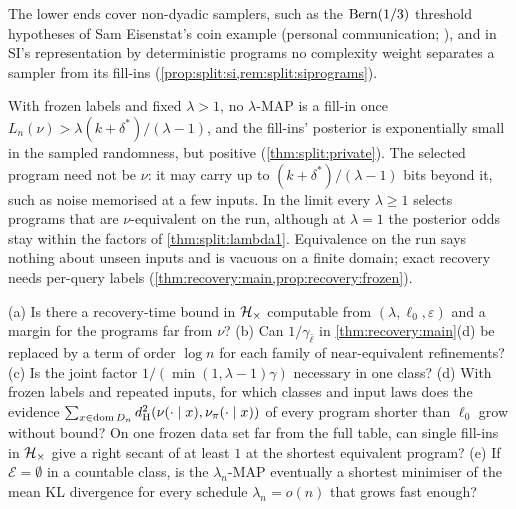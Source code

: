 The lower ends cover non-dyadic samplers, such as the $\operatorname{Bern}(1/3)$ threshold hypotheses of Sam Eisenstat's coin example (personal communication; \citealp[Section~7.3]{claudeSFI2026fundamentals}), %
and in SI's representation by deterministic programs no complexity weight separates a sampler from its fill-ins (\cref{prop:split:si,rem:split:siprograms}).

\begin{remark}\label{rem:split:reading}
With frozen labels and fixed $\lambda>1$, no $\lambda$-MAP is a fill-in once $L_n(\nu)>\lambda(k+\delta^*)/(\lambda-1)$, and the fill-ins' posterior is exponentially small in the sampled randomness, but positive (\cref{thm:split:private}). The selected program need not be $\nu$: it may carry up to $(k+\delta^*)/(\lambda-1)$ bits beyond it, such as noise memorised at a few inputs. In the limit every $\lambda\ge1$ selects programs that are $\nu$-equivalent on the run, although at $\lambda=1$ the posterior odds stay within the factors of \cref{thm:split:lambda1}. Equivalence on the run says nothing about unseen inputs and is vacuous on a finite domain; exact recovery needs per-query labels (\cref{thm:recovery:main,prop:recovery:frozen}).
\end{remark}

\begin{question}\label{q:recovery:open}
(a) Is there a recovery-time bound in $\mathcal{H}_{\times}$ computable from $(\lambda,\ell_0,\varepsilon)$ and a margin for the programs far from $\nu$? (b) Can $1/\gamma_{\bar\ell}$ in \cref{thm:recovery:main}(d) be replaced by a term of order $\log n$ for each family of near-equivalent refinements? (c) Is the joint factor $1/(\min(1,\lambda-1)\gamma)$ necessary in one class? (d) With frozen labels and repeated inputs, for which classes and input laws does the evidence $\sum_{x\in\operatorname{dom} D_n}d_{\mathrm{H}}^{2}(\nu(\cdot\mid x),\nu_\pi(\cdot\mid x))$ of every program shorter than $\ell_0$ grow without bound? On one frozen data set far from the full table, can single fill-ins in $\mathcal{H}_{\times}$ give a right secant of at least $1$ at the shortest equivalent program? (e) If $\mathcal E=\emptyset$ in a countable class, is the $\lambda_n$-MAP eventually a shortest minimiser of the mean KL divergence for every schedule $\lambda_n=o(n)$ that grows fast enough?
\end{question}
